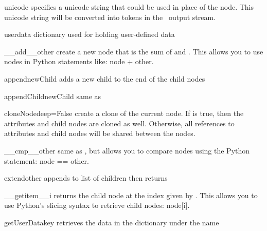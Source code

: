 \begin{memberdesc}[Node]{unicode}
specifies a unicode string that could be used in place of the node.
This unicode string will be converted into tokens in the \plasTeX\ 
output stream.
\end{memberdesc}

\begin{memberdesc}[Node]{userdata}
dictionary used for holding user-defined data
\end{memberdesc}


\begin{methoddesc}[Node]{__add__}{other}
create a new node that is the sum of  and .  This
allows you to use nodes in Python statements like: node + other.
\end{methoddesc}

\begin{methoddesc}[Node]{append}{newChild}
adds a new child to the end of the child nodes
\end{methoddesc}

\begin{methoddesc}[Node]{appendChild}{newChild}
same as 
\end{methoddesc}

\begin{methoddesc}[Node]{cloneNode}{deep=False}
create a clone of the current node.  If  is true, then the 
attributes and child nodes are cloned as well.  Otherwise, all references
to attributes and child nodes will be shared between the nodes.
\end{methoddesc}

\begin{methoddesc}[Node]{__cmp__}{other}
same as , but allows you to compare nodes using the
Python statement: node == other.
\end{methoddesc}

\begin{methoddesc}[Node]{extend}{other}
appends  to list of children then returns 
\end{methoddesc}

\begin{methoddesc}[Node]{__getitem__}{i}
returns the child node at the index given by .  This allows you to
use Python's slicing syntax to retrieve child nodes: node[i].
\end{methoddesc}

\begin{methoddesc}[Node]{getUserData}{key}
retrieves the data in the  dictionary under the name 
\end{methoddesc}

